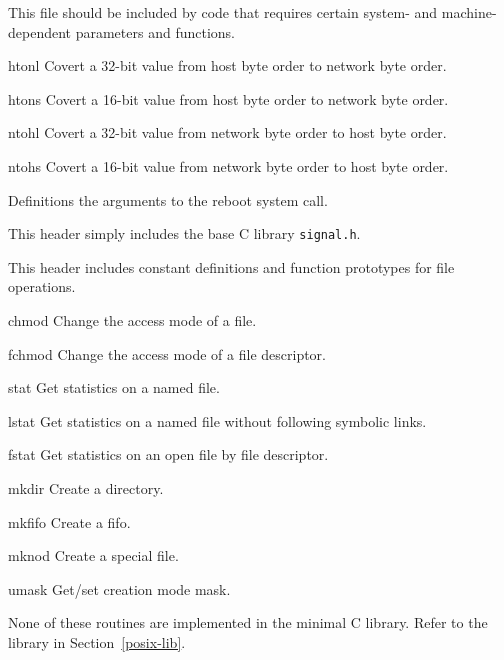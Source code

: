\label{sys-param-h}
\begin{apidesc}
	This file should be included by code that requires certain system- and
	machine-dependent parameters and functions.
	\begin{icsymlist}
		\item[htonl]
			Covert a 32-bit value from host byte order to network
			byte order.
		\item[htons]
			Covert a 16-bit value from host byte order to network
			byte order.
		\item[ntohl]
			Covert a 32-bit value from network byte order to host
			byte order.
		\item[ntohs]
			Covert a 16-bit value from network byte order to host
			byte order.
	\end{icsymlist}
\end{apidesc}

\label{sys-reboot-h}
\begin{apidesc}
	Definitions the arguments to the reboot system call.
\end{apidesc}

\label{sys-signal-h}
\begin{apidesc}
	This header simply includes the base C library \texttt{signal.h}.
\end{apidesc}

\label{sys-stat-h}
\begin{apidesc}
	This header includes constant definitions and function prototypes for
	file operations.
	\begin{icsymlist}
		\item[chmod]
			Change the access mode of a file.
		\item[fchmod]
			Change the access mode of a file descriptor.
		\item[stat]
			Get statistics on a named file.
		\item[lstat]
			Get statistics on a named file without following
			symbolic links.
		\item[fstat]
			Get statistics on an open file by file descriptor.
		\item[mkdir]
			Create a directory.
		\item[mkfifo]
			Create a fifo.
		\item[mknod]
			Create a special file.
		\item[umask]
			Get/set creation mode mask.
	\end{icsymlist}
	None of these routines are implemented in the minimal C library.
	Refer to the \posix{} library in Section~\ref{posix-lib}.
\end{apidesc}

